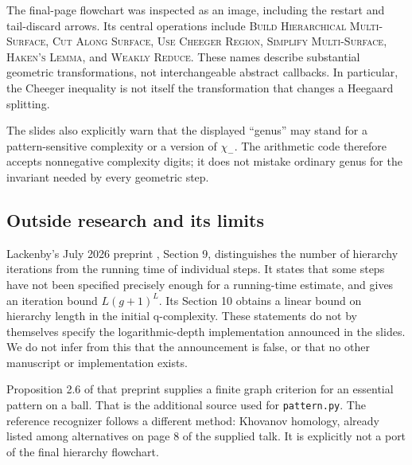 \documentclass[11pt]{article}
\theoremstyle{definition}
\newcommand{\code}[1]{\texttt{#1}}
\begin{document}
The final-page flowchart was inspected as an image, including the restart and
tail-discard arrows. Its central operations include
\textsc{Build Hierarchical Multi-Surface}, \textsc{Cut Along Surface},
\textsc{Use Cheeger Region}, \textsc{Simplify Multi-Surface},
\textsc{Haken's Lemma}, and \textsc{Weakly Reduce}. These names describe
substantial geometric transformations, not interchangeable abstract callbacks.
In particular, the Cheeger inequality is not itself the transformation that
changes a Heegaard splitting.

The slides also explicitly warn that the displayed ``genus'' may stand for a
pattern-sensitive complexity or a version of $\chi_-$. The arithmetic code
therefore accepts nonnegative complexity digits; it does not mistake ordinary
genus for the invariant needed by every geometric step.

\subsection{Outside research and its limits}
Lackenby's July 2026 preprint \cite{hierarchies}, Section 9, distinguishes the
number of hierarchy iterations from the running time of individual steps.
It states that some steps have not been specified precisely enough for a
running-time estimate, and gives an iteration bound $L(g+1)^L$. Its Section 10
obtains a linear bound on hierarchy length in the initial q-complexity.
These statements do not by themselves specify the logarithmic-depth
implementation announced in the slides. We do not infer from this that the
announcement is false, or that no other manuscript or implementation exists.

Proposition 2.6 of that preprint supplies a finite graph criterion for an
essential pattern on a ball. That is the additional source used for
\code{pattern.py}. The reference recognizer follows a different method:
Khovanov homology, already listed among alternatives on page 8 of the supplied
talk. It is explicitly not a port of the final hierarchy flowchart.
\end{document}
